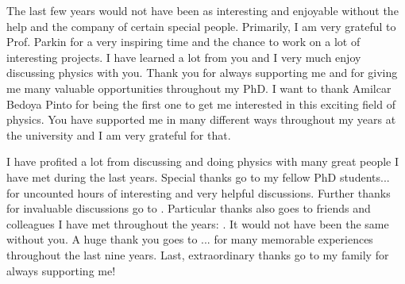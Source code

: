 
The last few years would not have been as interesting and enjoyable without the help and the company of certain special people.
Primarily, I am very grateful to Prof. Parkin for a very inspiring time and the chance to work on a lot of interesting projects.
I have learned a lot from you and I very much enjoy discussing physics with you.
Thank you for always supporting me and for giving me many valuable opportunities throughout my PhD.
I want to thank Amilcar Bedoya Pinto for being the first one to get me interested in this exciting field of physics.
You have supported me in many different ways throughout my years at the university and I am very grateful for that.

I have profited a lot from discussing and doing physics with many great people I have met during the last years.
Special thanks go to my fellow PhD students... for uncounted hours of interesting and very helpful discussions.
Further thanks for invaluable discussions go to .
Particular thanks also goes to friends and colleagues I have met throughout the years: .
It would not have been the same without you.
A huge thank you goes to ... for many memorable experiences throughout the last nine years.
Last, extraordinary thanks go to my family for always supporting me!